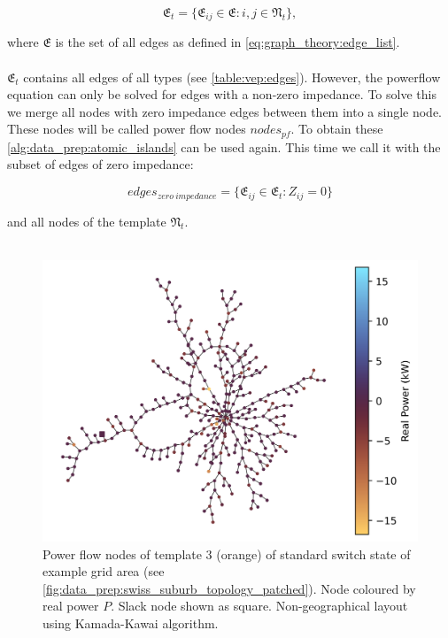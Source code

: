 \begin{equation}
    \mathfrak{E}_t = \{ \mathfrak{E}_{ij} \in \mathfrak{E} : i, j \in \mathfrak{N}_t \},
\end{equation}

where $\mathfrak{E}$ is the set of all edges as
defined in \autoref{eq:graph_theory:edge_list}.\\
\\
$\mathfrak{E}_t$ contains all edges of all types (see \autoref{table:vep:edges}).
However, the powerflow equation can only be solved for edges
with a non-zero impedance. To solve this we merge all nodes with
zero impedance edges between them into a single node. These nodes
will be called power flow nodes $nodes_{pf}$. To obtain these
\autoref{alg:data_prep:atomic_islands} can be used again. This time
we call it with the subset of edges of zero impedance:

\begin{equation}
    edges_{zero \ impedance} = \{ \mathfrak{E}_{ij} \in \mathfrak{E}_t : Z_{ij} = 0 \}
\end{equation}

and all nodes of the template $\mathfrak{N}_t$. \\
\\

\begin{figure}[h]
    \centering
    \includegraphics{img/switchstate_exploring/swiss_suburb/pf_island_powers.png}
    \caption{
        Power flow nodes of template 3 (orange) of standard switch state
        of example grid area (see \autoref{fig:data_prep:swiss_suburb_topology_patched}).
        Node coloured by real power $P$. Slack node shown as square. Non-geographical layout using
        Kamada-Kawai algorithm\autocite{kamada_kawai}.
    }
    \label{fig:pf_nodes_power_swiss_suburb}
\end{figure}


